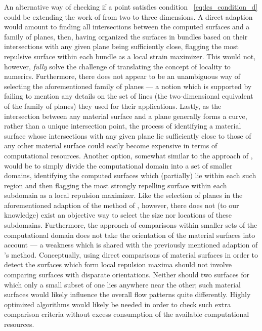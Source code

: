 An alternative way of checking if a point satisfies condition~%
\eqref{eq:lcs_condition_d} could be extending the work of
\textcite{farazmand2012computing} from two to three dimensions. A direct
adaption would amount to finding all intersections between the computed
surfaces and a family of planes, then, having organized the surfaces in bundles
based on their intersections with any given plane being sufficiently close,
flagging the most repulsive surface within each bundle as a local strain
maximizer. This would not, however, \emph{fully} solve the challenge of
translating the concept of locality to numerics. Furthermore, there does not
appear to be an unambiguous way of selecting the aforementioned family of
planes --- a notion which is supported by \textcite{farazmand2012computing}
failing to mention any details on the set of lines (the two-dimensional
equivalent of the family of planes) they used for their applications. Lastly,
as the intersection between any material surface and a plane generally forms a
curve, rather than a unique intersection point, the process of identifying a
material surface whose intersections with any given plane lie sufficiently
close to those of any other material surface could easily become expensive in
terms of computational resources.
\clearpage
Another option, somewhat similar to the approach of
\textcite{farazmand2012computing}, would be to simply divide the computational
domain into a set of smaller domains, identifying the computed surfaces which
(partially) lie within each such region and then flagging the most strongly
repelling surface within each subdomain as a local repulsion maximizer. Like
the selection of planes in the aforementioned adaption of the method of
\citeauthor{farazmand2012computing}, however, there does not (to our knowledge)
exist an objective way to select the size nor locations of these subdomains.
Furthermore, the approach of comparisons within smaller sets of the
computational domain does not take the orientation of the material surfaces
into account --- a weakness which is shared with the previously mentioned
adaption of \citeauthor{farazmand2012computing}'s method. Conceptually, using
direct comparisons of material surfaces in order to detect the surfaces which
form local repulsion maxima should not involve comparing surfaces with
disparate orientations. Neither should two surfaces for which only a small
subset of one lies anywhere near the other; such material surfaces would likely
influence the overall flow patterns quite differently. Highly optimized
algorithms would likely be needed in order to check such extra comparison
criteria without excess consumption of the available computational resources.

